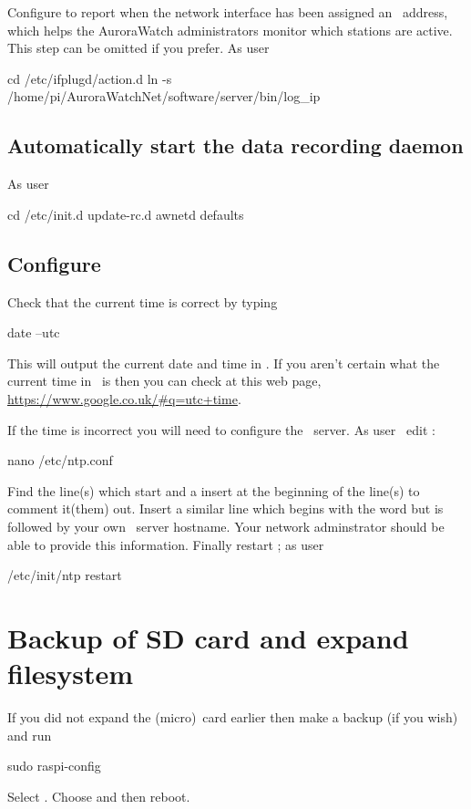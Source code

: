 Configure  to report when the network interface has
been assigned an \ip\ address, which helps the AuroraWatch
administrators monitor which stations are active. This step can be
omitted if you prefer. As user \rootUser
\begin{Cmd}
cd /etc/ifplugd/action.d
ln -s /home/pi/AuroraWatchNet/software/server/bin/log_ip
\end{Cmd}

\subsection{Automatically start the data recording daemon}
As user \rootUser
\begin{Cmd}
cd /etc/init.d
update-rc.d awnetd defaults
\end{Cmd}

%


\subsection{Configure \protect{}}
Check that the current time is correct by typing
\begin{Cmd}
date --utc
\end{Cmd}
This will output the current date and time in \utc. If you aren't
certain what the current time in \utc\ is then you can check at this
web page, \url{https://www.google.co.uk/#q=utc+time}.

If the time is incorrect you will need to configure the \ntp\
server. As user \rootUser\ edit :
\begin{Cmd}
nano /etc/ntp.conf
\end{Cmd}

Find the line(s) which start  and a insert
\filename{#} at the beginning of the line(s) to comment it(them)
out. Insert a similar line which begins with the word
 but is followed by your own \ntp\ server
hostname. Your network adminstrator should be able to provide this
information. Finally restart \ntp; as user \rootUser
\begin{Cmd}
/etc/init/ntp restart
\end{Cmd}




\section{Backup of SD card and expand filesystem}

If you did not expand the (micro)\sd\ card earlier then make a backup
(if you wish) and run
\begin{Cmd}
sudo raspi-config
\end{Cmd}
Select . Choose  and then reboot.

